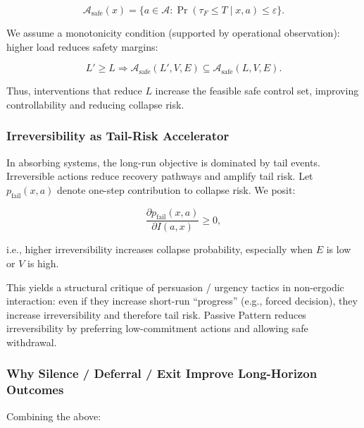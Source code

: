 \begin{equation}
\mathcal{A}_{\mathrm{safe}}(x) = \{a \in \mathcal{A} : \Pr(\tau_F \le T \mid x, a) \le \varepsilon\}.
\label{eq:pp-safe-action-set}
\end{equation}

We assume a monotonicity condition (supported by operational
observation): higher load reduces safety margins:

\begin{equation}
L' \ge L \Rightarrow
\mathcal{A}_{\mathrm{safe}}(L', V, E) \subseteq
\mathcal{A}_{\mathrm{safe}}(L, V, E).
\label{eq:pp-monotonicity}
\end{equation}

Thus, interventions that reduce $L$ increase the feasible safe
control set, improving controllability and reducing collapse risk.

\subsubsection{Irreversibility as Tail-Risk Accelerator}
\label{sec:pp-irreversibility-tail-risk}

In absorbing systems, the long-run objective is dominated by tail
events. Irreversible actions reduce recovery pathways and amplify
tail risk. Let $p_{\mathrm{fail}}(x, a)$ denote one-step contribution
to collapse risk. We posit:

\begin{equation}
\frac{\partial p_{\mathrm{fail}}(x, a)}{\partial I(a, x)} \ge 0,
\label{eq:pp-tail-risk}
\end{equation}

\noindent
i.e., higher irreversibility increases collapse probability,
especially when $E$ is low or $V$ is high.

This yields a structural critique of persuasion / urgency tactics
in non-ergodic interaction: even if they increase short-run
``progress'' (e.g., forced decision), they increase irreversibility
and therefore tail risk. Passive Pattern reduces irreversibility by
preferring low-commitment actions and allowing safe withdrawal.

\subsubsection{Why Silence / Deferral / Exit Improve Long-Horizon
Outcomes}
\label{sec:pp-silence-improves}

Combining the above:

